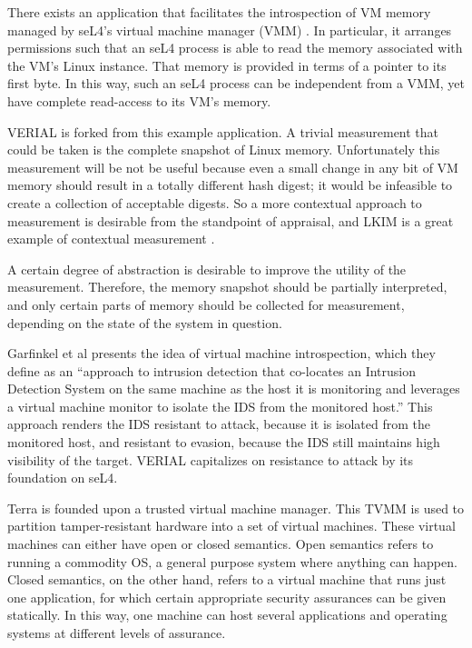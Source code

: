 \documentclass[a4paper,twoside]{article}
\begin{document}
There exists an application that facilitates the introspection of VM memory managed by seL4's virtual machine manager (VMM) \cite{camkesvmintro}. In particular, it arranges permissions such that an seL4 process is able to read the memory associated with the VM's Linux instance. That memory is provided in terms of a pointer to its first byte. In this way, such an seL4 process can be independent from a VMM, yet have complete read-access to its VM's memory.

VERIAL is forked from this example application. A trivial measurement that could be taken is the complete snapshot of Linux memory. Unfortunately this measurement will be not be useful because even a small change in any bit of VM memory should result in a totally different hash digest; it would be infeasible to create a collection of acceptable digests. So a more contextual approach to measurement is desirable from the standpoint of appraisal, and LKIM is a great example of contextual measurement \cite{LKIMPaid}.

A certain degree of abstraction is desirable to improve the utility of the measurement. Therefore, the memory snapshot should be partially interpreted, and only certain parts of memory should be collected for measurement, depending on the state of the system in question.

Garfinkel et al \cite{VMIntro} presents the idea of virtual machine introspection, which they define as an ``approach to intrusion detection that co-locates an Intrusion Detection System on the same machine as the host it is monitoring and leverages a virtual machine monitor to isolate the IDS from the monitored host.'' This approach renders the IDS resistant to attack, because it is isolated from the monitored host, and resistant to evasion, because the IDS still maintains high visibility of the target. VERIAL capitalizes on resistance to attack by its foundation on seL4.

Terra \cite{Terra} is founded upon a trusted virtual machine manager. This TVMM is used to partition tamper-resistant hardware into a set of virtual machines. These virtual machines can either have open or closed semantics. Open semantics refers to running a commodity OS, a general purpose system where anything can happen. Closed semantics, on the other hand, refers to a virtual machine that runs just one application, for which certain appropriate security assurances can be given statically. In this way, one machine can host several applications and operating systems at different levels of assurance.
\end{document}

